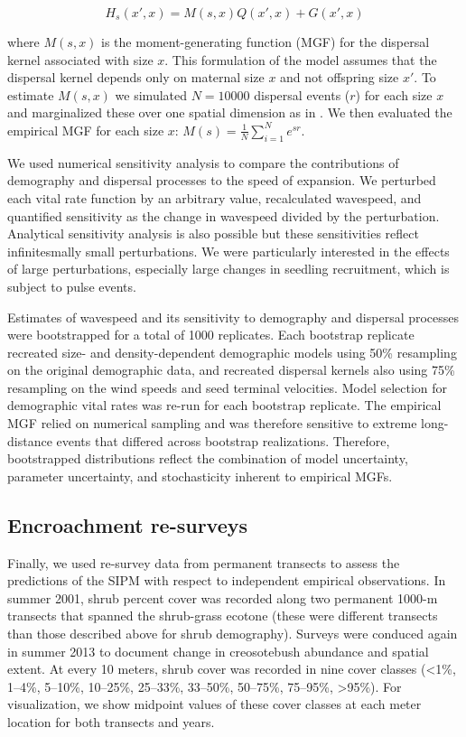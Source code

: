 \documentclass[11pt]{article}\usepackage[]{graphicx}\usepackage[]{color}
\begin{document}
\begin{linenomath*} 
\begin{equation} 
H_{s}(x\prime,x) = M(s,x)Q(x\prime,x) + G(x\prime,x)
\end{equation} 
\end{linenomath*}

where $M(s,x)$ is the moment-generating function (MGF) for the dispersal kernel associated with size $x$.
This formulation of the model assumes that the dispersal kernel depends only on maternal size $x$ and not offspring size $x\prime$.
To estimate $M(s,x)$ we simulated $N=10000$ dispersal events ($r$) for each size $x$ and marginalized these over one spatial dimension as in \cite{lewis2006guide}.
We then evaluated the empirical MGF for each size $x$: $M(s)=\frac{1}{N} \sum_{i=1}^{N}e^{sr}$. 

We used numerical sensitivity analysis to compare the contributions of demography and dispersal processes to the speed of expansion. 
We perturbed each vital rate function by an arbitrary value, recalculated wavespeed, and quantified sensitivity as the change in wavespeed divided by the perturbation. 
Analytical sensitivity analysis is also possible \citep{ellner2016data} but these sensitivities reflect infinitesmally small perturbations.
We were particularly interested in the effects of large perturbations, especially large changes in seedling recruitment, which is subject to pulse events. 

Estimates of wavespeed and its sensitivity to demography and dispersal processes were bootstrapped for a total of 1000 replicates.
Each bootstrap replicate recreated size- and density-dependent demographic models using 50\% resampling on the original demographic data, and recreated dispersal kernels also using 75\% resampling on the wind speeds and seed terminal velocities.
Model selection for demographic vital rates was re-run for each bootstrap replicate. 
The empirical MGF relied on numerical sampling and was therefore sensitive to extreme long-distance events that differed across bootstrap realizations. 
Therefore, bootstrapped distributions reflect the combination of model uncertainty, parameter uncertainty, and stochasticity inherent to empirical MGFs. 

\subsection*{Encroachment re-surveys}
Finally, we used re-survey data from permanent transects to assess the predictions of the SIPM with respect to independent empirical observations. 
In summer 2001, shrub percent cover was recorded along two permanent 1000-m transects that spanned the shrub-grass ecotone (these were different transects than those described above for shrub demography). 
Surveys were conduced again in summer 2013 to document change in creosotebush abundance and spatial extent. 
At every 10 meters, shrub cover was recorded in nine cover classes (<1\%, 1--4\%, 5--10\%, 10--25\%, 25--33\%, 33--50\%, 50--75\%, 75--95\%, >95\%). 
For visualization, we show midpoint values of these cover classes at each meter location for both transects and years. 
\end{document}
